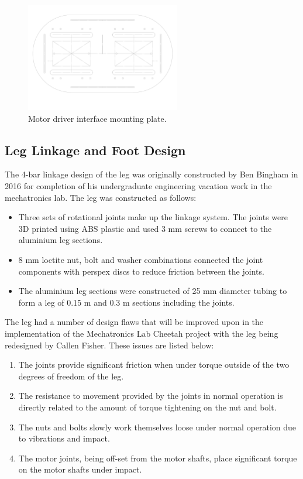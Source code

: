 \begin{figure}
\centering
\includegraphics[width=0.6\textwidth]{images/mechanical/driver-mount-plate.pdf} 
\caption{Motor driver interface mounting plate.}
\label{fig:Motor driver interface mounting plate}
\end{figure}

\subsection{Leg Linkage and Foot Design}

The 4-bar linkage design of the leg was originally constructed by Ben Bingham in 2016 for completion of his undergraduate engineering vacation work in the mechatronics lab. The leg was constructed as follows:

\begin{itemize}
\item Three sets of rotational joints make up the linkage system. The joints were 3D printed using ABS plastic and used 3 mm screws to connect to the aluminium leg sections.
\item 8 mm loctite nut, bolt and washer combinations connected the joint components with perspex discs to reduce friction between the joints.
\item The aluminium leg sections were constructed of 25 mm diameter tubing to form a leg of 0.15 m and 0.3 m sections including the joints. 
\end{itemize}

The leg had a number of design flaws that will be improved upon in the implementation of the Mechatronics Lab Cheetah project with the leg being redesigned by Callen Fisher. These issues are listed below:

\begin{enumerate}
\item The joints provide significant friction when under torque outside of the two degrees of freedom of the leg. 
\item The resistance to movement provided by the joints in normal operation is directly related to the amount of torque tightening on the nut and bolt. 
\item The nuts and bolts slowly work themselves loose under normal operation due to vibrations and impact.
\item The motor joints, being off-set from the motor shafts, place significant torque on the motor shafts under impact.
\end{enumerate} 

